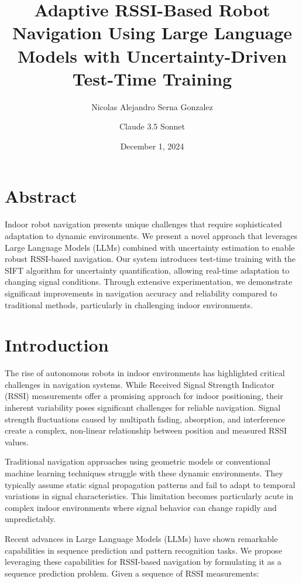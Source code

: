 \documentclass[12pt]{article}
\title{\textbf{Adaptive RSSI-Based Robot Navigation Using Large Language Models with Uncertainty-Driven Test-Time Training}}
\author{Nicolas Alejandro Serna Gonzalez \and Claude 3.5 Sonnet}
\date{December 1, 2024}
\begin{document}
\maketitle

\section*{Abstract}

Indoor robot navigation presents unique challenges that require sophisticated adaptation to dynamic environments. We present a novel approach that leverages Large Language Models (LLMs) combined with uncertainty estimation to enable robust RSSI-based navigation. Our system introduces test-time training with the SIFT algorithm for uncertainty quantification, allowing real-time adaptation to changing signal conditions. Through extensive experimentation, we demonstrate significant improvements in navigation accuracy and reliability compared to traditional methods, particularly in challenging indoor environments.

\section{Introduction}

The rise of autonomous robots in indoor environments has highlighted critical challenges in navigation systems. While Received Signal Strength Indicator (RSSI) measurements offer a promising approach for indoor positioning, their inherent variability poses significant challenges for reliable navigation. Signal strength fluctuations caused by multipath fading, absorption, and interference create a complex, non-linear relationship between position and measured RSSI values.

Traditional navigation approaches using geometric models or conventional machine learning techniques struggle with these dynamic environments. They typically assume static signal propagation patterns and fail to adapt to temporal variations in signal characteristics. This limitation becomes particularly acute in complex indoor environments where signal behavior can change rapidly and unpredictably.

Recent advances in Large Language Models (LLMs) have shown remarkable capabilities in sequence prediction and pattern recognition tasks. We propose leveraging these capabilities for RSSI-based navigation by formulating it as a sequence prediction problem. Given a sequence of RSSI measurements:
\end{document}

